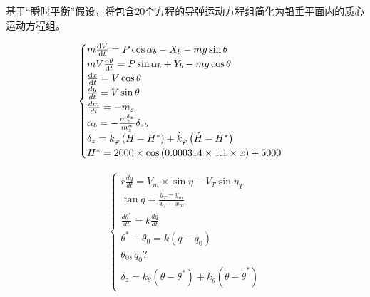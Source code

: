 \documentclass[UTF8]{ctexart}
\begin{document}
基于“瞬时平衡”假设，将包含20个方程的导弹运动方程组简化为铅垂平面内的质心运动方程组。

\begin{align}
    \begin{cases}
        m\frac{\mathrm{d}V}{\mathrm{d}t}=P\cos\alpha _{b}-X_{b}-mg\sin\theta\hfill                            \\
        mV\frac{\mathrm{d}\theta}{\mathrm{d}t}=P\sin\alpha _{b}+Y_{b}-mg\cos\theta\hfill                      \\
        \frac{\mathrm{d}x}{\mathrm{d}t}=V\cos\theta \hfill                                                    \\
        \frac{dy}{dt}=V\sin\theta \hfill                                                                      \\
        \frac{dm}{dt}=-m_{s} \hfill                                                                           \\
        \alpha_b=-\frac{m_{z}^{\delta_z}}{m_{z}^{\alpha}}\delta_{zb} \hfill                                   \\
        \delta_z = k_\varphi \left(H-H^{*}\right) +\dot{k}_{\varphi} \left(\dot{H} -\dot{H}^{*}\right) \hfill \\
        H^{*}=2000\times \cos\left(0.000314\times1.1\times x\right)+5000\hfill
    \end{cases}
\end{align}






\begin{align}
    \begin{cases}
        r\frac{dq}{dt}=V_{m}\times\sin\eta-V_{T}\sin\eta_{T} \\
        \tan q=\frac{y_{T}-y_{m}}{x_{T}-x_{m}}               \\
        \frac{d\theta^*}{dt}=k\frac{dq}{dt}                  \\
        \theta^{*}-\theta_{0}=k(q-q_{0})                     \\
        \theta_{0},q_{0}?                                    \\
        \delta_{z}=k_{\theta}(\theta-\theta^{*})+k_{\dot{\theta}}(\dot{\theta}-\dot{\theta}^{*})
    \end{cases}
\end{align}
\end{document}
